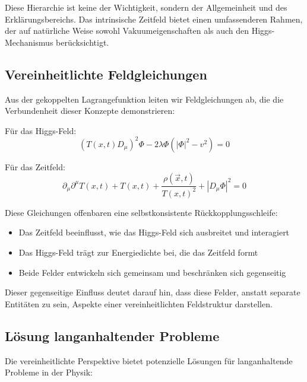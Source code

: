 \documentclass[12pt,a4paper]{article}
\newcommand{\Tfieldt}{T(x,t)}
\newcommand{\vecx}{\vec{x}}
\begin{document}
	Diese Hierarchie ist keine der Wichtigkeit, sondern der Allgemeinheit und des Erklärungsbereichs. Das intrinsische Zeitfeld bietet einen umfassenderen Rahmen, der auf natürliche Weise sowohl Vakuumeigenschaften als auch den Higgs-Mechanismus berücksichtigt.
	
	\subsection{Vereinheitlichte Feldgleichungen}
	\label{subsec:unified_equations}
	
	Aus der gekoppelten Lagrangefunktion leiten wir Feldgleichungen ab, die die Verbundenheit dieser Konzepte demonstrieren:
	
	Für das Higgs-Feld:
	\begin{equation}
		(\Tfieldt D_\mu)^2 \Phi - 2\lambda\Phi(|\Phi|^2 - v^2) = 0
	\end{equation}
	
	Für das Zeitfeld:
	\begin{equation}
		\partial_\mu\partial^\mu\Tfieldt + \Tfieldt + \frac{\rho(\vecx,t)}{\Tfieldt^2} + |D_\mu\Phi|^2 = 0
	\end{equation}
	
	Diese Gleichungen offenbaren eine selbstkonsistente Rückkopplungsschleife:
	\begin{itemize}
		\item Das Zeitfeld beeinflusst, wie das Higgs-Feld sich ausbreitet und interagiert
		\item Das Higgs-Feld trägt zur Energiedichte bei, die das Zeitfeld formt
		\item Beide Felder entwickeln sich gemeinsam und beschränken sich gegenseitig
	\end{itemize}
	
	Dieser gegenseitige Einfluss deutet darauf hin, dass diese Felder, anstatt separate Entitäten zu sein, Aspekte einer vereinheitlichten Feldstruktur darstellen.
	
	\subsection{Lösung langanhaltender Probleme}
	\label{subsec:resolution_problems}
	
	Die vereinheitlichte Perspektive bietet potenzielle Lösungen für langanhaltende Probleme in der Physik:
	
\end{document}
